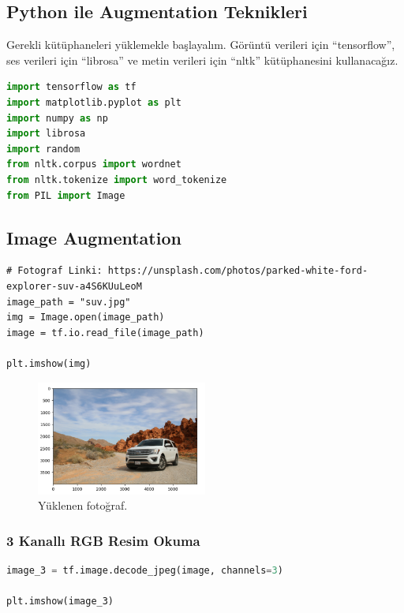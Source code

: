 \subsection{Python ile Augmentation Teknikleri}
Gerekli kütüphaneleri yüklemekle başlayalım. Görüntü verileri için “tensorflow”, ses verileri için “librosa” ve metin verileri için “nltk” kütüphanesini kullanacağız. 

\begin{lstlisting}[language=Python]
import tensorflow as tf
import matplotlib.pyplot as plt
import numpy as np
import librosa
import random
from nltk.corpus import wordnet
from nltk.tokenize import word_tokenize
from PIL import Image
\end{lstlisting}

\subsection{Image Augmentation}
\begin{lstlisting}
# Fotograf Linki: https://unsplash.com/photos/parked-white-ford-explorer-suv-a4S6KUuLeoM 
image_path = "suv.jpg"
img = Image.open(image_path)
image = tf.io.read_file(image_path)

plt.imshow(img)
\end{lstlisting}

\begin{figure}[ht]
    \centering
    \includegraphics[width=0.5\textwidth]{images/image_aug_01.png}
    \caption{Yüklenen fotoğraf.}
    \label{fig:enter-label}
\end{figure}

\subsubsection{3 Kanallı RGB Resim Okuma}

\begin{lstlisting}[language=Python]
image_3 = tf.image.decode_jpeg(image, channels=3)

plt.imshow(image_3)
\end{lstlisting}

